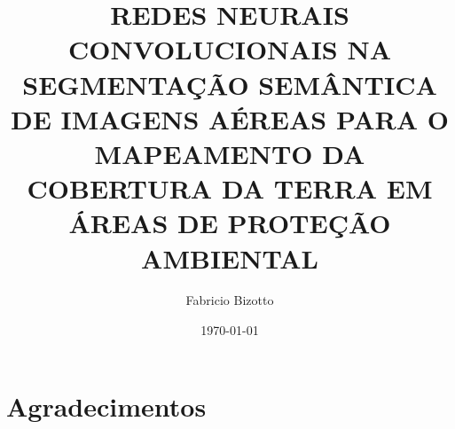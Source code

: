 \documentclass[%
  10pt,%
  aspectratio = 169,%
  compress,%
  t,%
  english,%
  brazilian,%
  tikz,
]{beamer}
\begin{document}

\section{Agradecimentos}\label{sec:agrad}

\begin{frame}{}{}
    \begin{minipage}[c][\textheight][c]{\textwidth}
        \centering
        \title{REDES NEURAIS CONVOLUCIONAIS NA SEGMENTAÇÃO SEMÂNTICA DE IMAGENS AÉREAS PARA O MAPEAMENTO DA COBERTURA DA TERRA EM ÁREAS DE PROTEÇÃO AMBIENTAL}
        \author{Fabricio Bizotto}
        \date{\today}
        \maketitle
    \end{minipage}
\end{frame}




\end{document}
